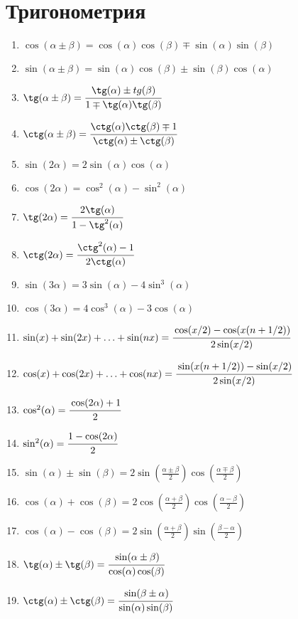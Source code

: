 \documentclass[a4paper,12pt]{scrartcl}
\begin{document}
\section{Тригонометрия}
\begin{multicols}{2}
\begin{enumerate}
\item $ \cos(\alpha \pm \beta) = \cos(\alpha)\cos(\beta)\mp \sin(\alpha)\sin(\beta)$
\item $ \sin(\alpha \pm \beta) = \sin(\alpha)\cos(\beta)\pm\sin(\beta)\cos(\alpha)$
\item $ \tg(\alpha \pm \beta) = \cfrac{\tg(\alpha) \pm tg(\beta)}{1 \mp \tg(\alpha)\tg(\beta)}$
\item $ \ctg(\alpha \pm \beta) = \cfrac{\ctg(\alpha)\ctg(\beta) \mp 1}{\ctg(\alpha) \pm  \ctg(\beta)}$

\item $ \sin(2 \alpha) = 2 \sin(\alpha)\cos(\alpha)$
\item $ \cos(2\alpha) = \cos^{2}(\alpha) - \sin^{2}(\alpha)$
\item $ \tg(2\alpha) = \cfrac{2\tg(\alpha)}{1 -\tg^{2}(\alpha)}$
\item $ \ctg(2\alpha) = \cfrac{\ctg^{2}(\alpha) - 1}{2\ctg(\alpha)}$

\item $ \sin(3\alpha) = 3\sin(\alpha) - 4\sin^{3}(\alpha)$
\item $ \cos(3\alpha) = 4\cos^{3}(\alpha) - 3\cos(\alpha)$

\item $ \sin(x) + \sin(2x) + \ldots +\sin(nx) = \cfrac{\cos(x/2)-\cos(x(n+1/2))}{2\sin(x/2)}$
\item $ \cos(x) + \cos(2x) + \ldots +\cos(nx) = \cfrac{\sin(x(n+1/2))-\sin(x/2)}{2\sin(x/2)}$

\item $ \cos^{2}(\alpha) = \cfrac{\cos(2\alpha)+1}{2}$
\item $ \sin^{2}(\alpha) = \cfrac{1 - \cos(2\alpha)}{2}$

\item $ \sin(\alpha) \pm \sin(\beta) = 2\sin(\frac{\alpha \pm \beta}{2})\cos(\frac{\alpha \mp \beta}{2})$
\item $ \cos(\alpha) + \cos(\beta) = 2\cos(\frac{\alpha + \beta}{2})\cos(\frac{\alpha - \beta}{2})$
\item $ \cos(\alpha) - \cos(\beta) = 2\sin(\frac{\alpha + \beta}{2})\sin(\frac{\beta - \alpha}{2})$
\item $ \tg(\alpha) \pm \tg(\beta) = \cfrac{\sin(\alpha \pm \beta)}{\cos(\alpha)\cos(\beta)} $
\item $ \ctg(\alpha) \pm \ctg(\beta) = \cfrac{\sin(\beta \pm \alpha)}{\sin(\alpha)\sin(\beta)} $


\end{enumerate}
\end{multicols}
\end{document}
